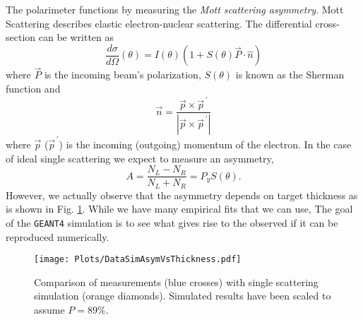 \documentclass[11pt]{article}
\begin{document}
The polarimeter functions by measuring the \textit{Mott scattering asymmetry}. Mott Scattering describes elastic electron-nuclear scattering. The differential cross-section can be written as
\begin{equation}
 \frac{d\sigma}{d\Omega}(\theta) = I(\theta)\left(1 + S(\theta)\vec{P}\cdot\hat{n}\right)
\end{equation}
where $\vec{P}$ is the incoming beam's polarization, $S(\theta)$ is known as the Sherman function and 
\begin{equation}
 \vec{n} = \frac{\vec{p}\times\vec{p}^{\,\prime}}{\left|\vec{p}\times\vec{p}^{\,\prime}\right|}
\end{equation}
where $\vec{p}$ ($\vec{p}^{\,\prime}$) is the incoming (outgoing) momentum of the electron. In the case of ideal single scattering we expect to measure an asymmetry,
\begin{equation}
 \label{eq:SimpleAsym}
 A = \frac{N_L-N_R}{N_L+N_R} = P_yS(\theta).
\end{equation}
However, we actually observe that the asymmetry depends on target thickness as is shown in Fig. \ref{fig:DataVsSingleSim}. While we have many empirical fits that we can use, The goal of the \texttt{GEANT4} simulation is to see what gives rise to the observed if it can be reproduced numerically. 

\begin{figure}[!h]
 \centering
 \texttt{[image: Plots/DataSimAsymVsThickness.pdf]}
 \caption{Comparison of measurements (blue crosses) with single scattering simulation (orange diamonds). Simulated results have been scaled to assume $P = 89\%$.} 
\label{fig:DataVsSingleSim}
\end{figure}
\end{document}
